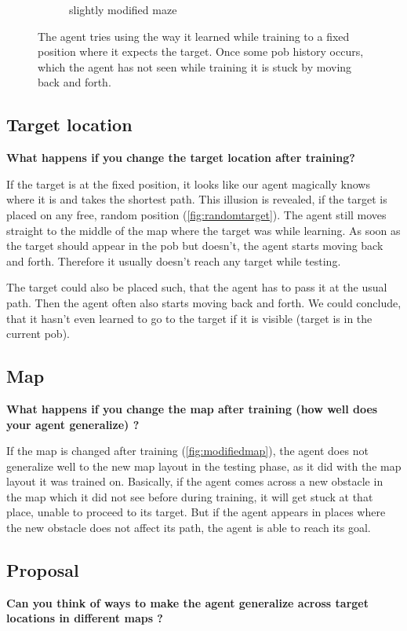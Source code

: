 \documentclass[a4paper,14pt]{article}
\begin{document}
\begin{figure}
\begin{subfigure}[b]{0.3\textwidth}
        \caption{slightly modified maze}
        \label{fig:modifiedmap}
    \end{subfigure}
    \caption{The agent tries using the way it learned while training to a fixed
      position where it expects the target. Once some pob history occurs, which the agent has
      not seen while training it is stuck by moving back and forth.}\label{fig:generalization}
\end{figure}

\subsection{Target location}

\textbf{What happens if you change the target location after training?}

If the target is at the fixed position, it looks like our agent magically knows
where it is and takes the shortest path.
This illusion is revealed, if the target is placed on any free, random position (\autoref{fig:randomtarget}).
The agent still moves straight to the middle of the map where the target was
while learning. As soon as the target should appear in the pob but doesn't, the
agent starts moving back and forth.
Therefore it usually doesn't reach any target while testing.

The target could also be placed such, that the agent has to pass it at the usual
path. Then the agent often also starts moving back and forth.
We could conclude, that it hasn't even learned to go to the target if it is
visible (target is in the current pob).

\subsection{Map}

\textbf{What happens if you change the map after training (how well does your agent generalize) ?}

If the map is changed after training (\autoref{fig:modifiedmap}), the agent does not generalize well to the new map layout in the testing phase, as it did with the map layout it was trained on.
Basically, if the agent comes across a new obstacle in the map which it did not see before during training, it will get stuck at that place, unable to proceed to its target. But if the agent appears in places where the new obstacle does not affect its path, the agent is able to reach its goal.

\subsection{Proposal}
\textbf{Can you think of ways to make the agent generalize across target locations in different maps ?}
\end{document}
